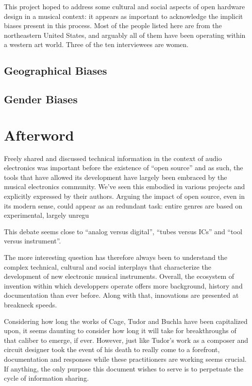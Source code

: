 This project hoped to address some cultural and social aspects of open hardware design in a musical context: it appears as important to acknowledge the implicit biases present in this process. Most of the people listed here are from the northeastern United States, and arguably all of them have been operating within a western art world. Three of the ten interviewees are women.

\subsection{Geographical Biases}

\subsection{Gender Biases}

\section{Afterword}


Freely shared and discussed technical information in the context of audio electronics was important before the existence of ``open source'' and as such, the tools that have allowed its development have largely been embraced by the musical electronics community. We've seen this embodied in various projects and explicitly expressed by their authors. Arguing the impact of open source, even in its modern sense, could  appear as an redundant task: entire genres are based on experimental, largely unregu


 This debate seems close to ``analog versus digital'', ``tubes versus ICs'' and ``tool versus instrument''. 

The more interesting question has therefore always been to understand the complex technical, cultural and social interplays that characterize the development of new electronic musical instruments. Overall, the ecosystem of invention within which developpers operate offers more background, history and documentation than ever before. Along with that, innovations are presented at breakneck speeds. 

Considering how long the works of Cage, Tudor and Buchla have been capitalized upon, it seems daunting to consider how long it will take for breakthroughs of that caliber to emerge, if ever. However, just like Tudor's work as a composer and circuit designer took the event of his death to really come to a forefront, documentation and responses while these practitioners are working seems crucial. If anything, the only purpose this document wishes to serve is to perpetuate the cycle of information sharing. 
